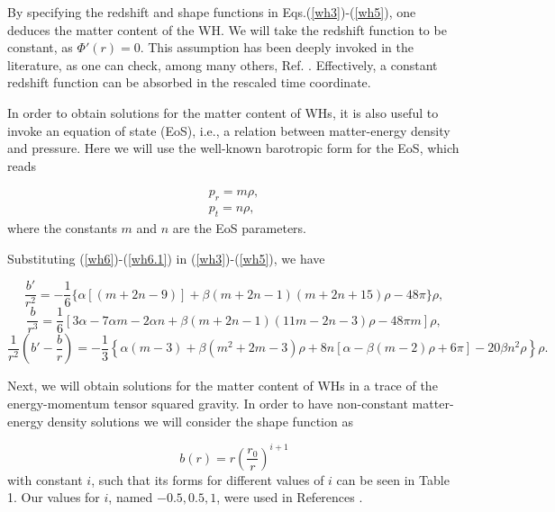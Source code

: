 \documentclass[twocolumn,showpacs,aps,amssymb,floatfix,prd,amsmath,preprintnumbers]{revtex4}
\begin{document}
By specifying the redshift and shape functions in Eqs.(\ref{wh3})-(\ref{wh5}), one deduces the matter content of the WH. We will take the redshift function to be constant, as $\Phi'(r)=0$. This assumption has been deeply invoked in the literature, as one can check, among many others, Ref. \cite{zubair/2016}. Effectively, a constant redshift function can be absorbed in the rescaled time coordinate.

In order to obtain solutions for the matter content of WHs, it is also useful to invoke an equation of state (EoS), i.e., a relation between matter-energy density and pressure. Here we will use the well-known barotropic form for the EoS, which reads \cite{mustapha/2015}

\begin{eqnarray}
p_r=m\rho, \label{wh6} \\
p_t=n\rho, \label{wh6.1}
\end{eqnarray}
where the constants $m$ and $n$ are the EoS parameters.

Substituting (\ref{wh6})-(\ref{wh6.1}) in (\ref{wh3})-(\ref{wh5}), we have

\begin{widetext}
\begin{equation}\label{wh7}
\frac{b'}{r^{2}}=-\frac{1}{6} \{\alpha  [(m+2 n-9)]+\beta  (m+2 n-1) (m+2 n+15)\rho-48 \pi \}\rho,
\end{equation}
\begin{equation}\label{wh8}
\frac{b}{r^3}=\frac{1}{6} [3 \alpha -7 \alpha  m-2 \alpha  n+\beta  (m+2 n-1) (11 m-2 n-3)\rho-48 \pi  m]\rho,
\end{equation}
\begin{equation}\label{wh9}
\frac{1}{r^2}\left(b'-\frac{b}{r}\right)=-\frac{1}{3} \left\{\alpha  (m-3)+\beta  \left(m^2+2 m-3\right) \rho +8 n [\alpha -\beta  (m-2) \rho +6 \pi ]-20 \beta  n^2 \rho \right\}\rho.
\end{equation}
\end{widetext}

Next, we will obtain solutions for the matter content of WHs in a trace of the energy-momentum tensor squared gravity. In order to have non-constant matter-energy density solutions we will consider the shape function as 

\begin{equation}\label{shape}
b(r)=r\left(\frac{r_0}{r}\right)^{i+1}
\end{equation}
with constant $i$, such that its forms for different values of $i$ can be seen in Table 1. Our values for $i$, named $-0.5,0.5,1$, were used in References \cite{lobo/2009,Pavlovic/2015}.
 
\end{document}
